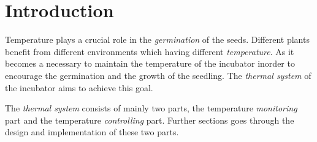 \documentclass[../../main]{subfiles}
\begin{document}
\section{Introduction} \label{sec:}

Temperature plays a crucial role in the \emph{germination} of the seeds. Different plants benefit
from different environments which having different \emph{temperature}. As it becomes a necessary to
maintain the temperature of the incubator inorder to encourage the germination and the growth
of the seedling. The \emph{thermal system} of the incubator aims to achieve this goal.

The \emph{thermal system} consists of mainly two parts, the temperature \emph{monitoring} part and the
temperature \emph{controlling} part. Further sections goes through the design and implementation
of these two parts.
\end{document}
